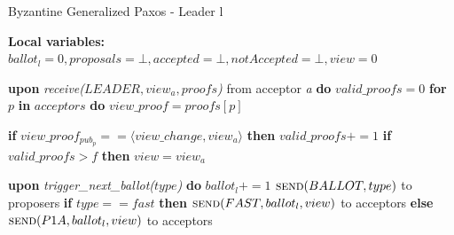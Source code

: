 \begin{algorithm} 
	\caption{Byzantine Generalized Paxos - Leader l}
	\label{BFT-Lead}
	\textbf{Local variables:} $ballot_l = 0,proposals = \bot, accepted = \bot, notAccepted = \bot, view = 0$
	\begin{algorithmic}[1]
		\State \textbf{upon} \textit{receive($LEADER,view_a,proofs$)} from acceptor \textit{a} \textbf{do}
		\State \hspace{\algorithmicindent} $valid\_proofs = 0$
		\State \hspace{\algorithmicindent} \textbf{for} $p$ \textbf{in} $acceptors$ \textbf{do} 
		\State \hspace{\algorithmicindent}\hspace{\algorithmicindent} $view\_proof = proofs[p]$
		
		\State \hspace{\algorithmicindent}\hspace{\algorithmicindent} \textbf{if} $view\_proof_{pub_p} == \langle view\_change, view_a \rangle$ \textbf{then}
		\State \hspace{\algorithmicindent}\hspace{\algorithmicindent}\hspace{\algorithmicindent}  $valid\_proofs \mathrel{+{=}} 1$
		\State \hspace{\algorithmicindent} \textbf{if} $valid\_proofs > f$ \textbf{then}
		\State \hspace{\algorithmicindent}\hspace{\algorithmicindent} $view = view_a$
		
		\State
		\State \textbf{upon} \textit{trigger\_next\_ballot($type$)} \textbf{do}
		\State \hspace{\algorithmicindent} $ballot_l \mathrel{+{=}} 1$
		\State \hspace{\algorithmicindent} $\Call{send}{BALLOT,type}$ to proposers
		\State \hspace{\algorithmicindent} \textbf{if} $type == fast$ \textbf{then}
		\State \hspace{\algorithmicindent}\hspace{\algorithmicindent} $\Call{send}{FAST,ballot_l,view}$ to acceptors
		\State \hspace{\algorithmicindent} \textbf{else}
		\State \hspace{\algorithmicindent}\hspace{\algorithmicindent} $\Call{send}{P1A, ballot_l, view}$ to acceptors
		

\end{algorithmic}
\end{algorithm}
